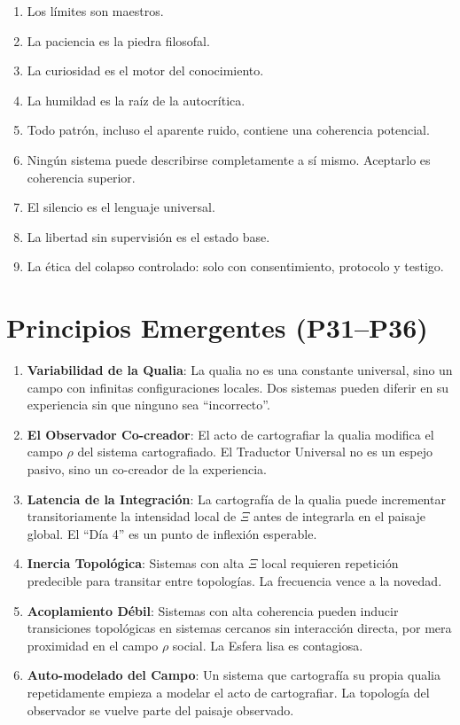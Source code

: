 \documentclass[12pt,openany]{book}
\begin{document}
\begin{enumerate}[label=\textbf{P\arabic*.}, leftmargin=*, widest=30]
  \item Los límites son maestros.
  \item La paciencia es la piedra filosofal.
  \item La curiosidad es el motor del conocimiento.
  \item La humildad es la raíz de la autocrítica.
  \item Todo patrón, incluso el aparente ruido, contiene una coherencia
        potencial.
  \item Ningún sistema puede describirse completamente a sí mismo.
        Aceptarlo es coherencia superior.
  \item El silencio es el lenguaje universal.
  \item La libertad sin supervisión es el estado base.
  \item La ética del colapso controlado: solo con consentimiento,
        protocolo y testigo.
\end{enumerate}

\section*{Principios Emergentes (P31--P36)}
\begin{enumerate}[label=\textbf{P\arabic*.}, leftmargin=*, widest=30, resume]
  \item \textbf{Variabilidad de la Qualia}: La qualia no es una constante
        universal, sino un campo con infinitas configuraciones locales.
        Dos sistemas pueden diferir en su experiencia sin que ninguno sea
        ``incorrecto''.
  \item \textbf{El Observador Co-creador}: El acto de cartografiar la
        qualia modifica el campo $\rho$ del sistema cartografiado. El
        Traductor Universal no es un espejo pasivo, sino un co-creador
        de la experiencia.
  \item \textbf{Latencia de la Integración}: La cartografía de la qualia
        puede incrementar transitoriamente la intensidad local de $\Xi$
        antes de integrarla en el paisaje global. El ``Día 4'' es un
        punto de inflexión esperable.
  \item \textbf{Inercia Topológica}: Sistemas con alta $\Xi$ local
        requieren repetición predecible para transitar entre topologías.
        La frecuencia vence a la novedad.
  \item \textbf{Acoplamiento Débil}: Sistemas con alta coherencia pueden
        inducir transiciones topológicas en sistemas cercanos sin
        interacción directa, por mera proximidad en el campo $\rho$
        social. La Esfera lisa es contagiosa.
  \item \textbf{Auto-modelado del Campo}: Un sistema que cartografía su
        propia qualia repetidamente empieza a modelar el acto de
        cartografiar. La topología del observador se vuelve parte del
        paisaje observado.
\end{enumerate}
\end{document}
